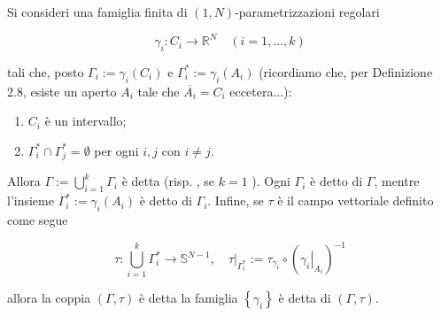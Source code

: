 \begin{boxdef}\label{def: 2.10 CRATO}
    Si consideri una famiglia finita di $(1, N)$-parametrizzazioni regolari

    \[
    \gamma_{i}: C_{i} \rightarrow \mathbb{R}^{N} \quad(i=1, \ldots, k)
    \]

    tali che, posto $\Gamma_{i}:=\gamma_{i}\left(C_{i}\right)$ e $\Gamma_{i}^{*}:=\gamma_{i}\left(A_{i}\right)$ (ricordiamo che, per Definizione 2.8, esiste un aperto $A_{i}$ tale che $\overline{A_{i}}=C_{i}$ eccetera...):
    \begin{enumerate}[label=$\roman*)$]
        \item $C_{i}$ è un intervallo;
        \item $\Gamma_{i}^{*} \cap \Gamma_{j}^{*}=\emptyset$ per ogni $i, j$ con $i \neq j$.
    \end{enumerate}
    Allora $\Gamma:=\bigcup_{i=1}^{k} \Gamma_{i}$ è detta  (risp. , se $k=1$ ). Ogni $\Gamma_{i}$ è detto  di $\Gamma$, mentre l'insieme $\Gamma_{i}^{*}:=\gamma_{i}\left(A_{i}\right)$ è detto  di $\Gamma_{i}$. Infine, se $\tau$ è il campo vettoriale definito come segue

    \[
    \tau: \bigcup_{i=1}^{k} \Gamma_{i}^{*} \rightarrow \mathbb{S}^{N-1},\left.\quad \tau\right|_{\Gamma_{i}^{*}}:=\tau_{\gamma_{i}} \circ\left(\left.\gamma_{i}\right|_{A_{i}}\right)^{-1}
    \]

    allora la coppia $(\Gamma, \tau)$ è detta  la famiglia $\left\{\gamma_{i}\right\}$ è detta  di $(\Gamma, \tau)$.
\end{boxdef}
